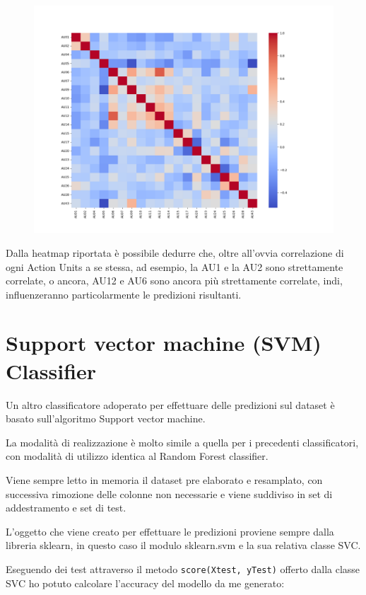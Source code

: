 \begin{figure}
    \begin{center}    
        \includegraphics[width=0.9\linewidth]{images/image39.png}
    \end{center}
\end{figure}

Dalla heatmap riportata è possibile dedurre che, oltre all’ovvia correlazione di ogni Action Units a se stessa, ad esempio, la AU1 e la AU2 sono strettamente correlate, o ancora, AU12 e AU6 sono ancora più strettamente correlate, indi, influenzeranno particolarmente le predizioni risultanti.


\section{Support vector machine (SVM) Classifier}
Un altro classificatore adoperato per effettuare delle predizioni sul dataset è basato sull’algoritmo Support vector machine.

La modalità di realizzazione è molto simile a quella per i precedenti classificatori, con modalità di utilizzo identica al Random Forest classifier.

Viene sempre letto in memoria il dataset pre elaborato e resamplato, con successiva rimozione delle colonne non necessarie e viene suddiviso in set di addestramento e set di test.

L’oggetto che viene creato per effettuare le predizioni proviene sempre dalla libreria sklearn, in questo caso il modulo sklearn.svm e la sua relativa classe SVC.

Eseguendo dei test attraverso il metodo \mintinline[bgcolor=bg]
{python}{score(Xtest, yTest)} offerto dalla classe SVC ho potuto calcolare l’accuracy del modello da me generato:

